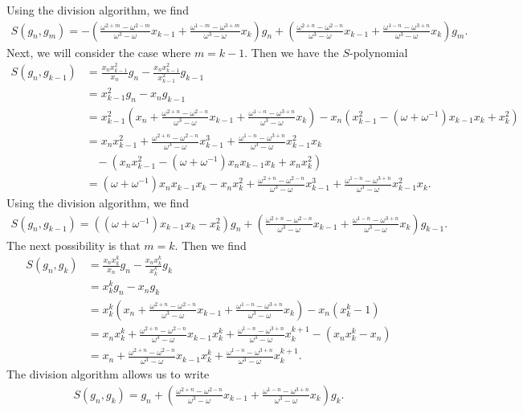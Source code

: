 \documentclass[letterpaper]{article}
\newcommand{\aln}[1]{\begin{align*} #1 \end{align*}} %
\newcommand{\fitp}[1]{\left( #1 \right)} %
\begin{document}
Using the division algorithm, we find
\aln{
  S(g_n, g_m) = -\fitp{\frac{\omega^{2+m} - \omega^{2-m}}{\omega^3-\omega} x_{k-1} + \frac{\omega^{1-m} - \omega^{3+m}}{\omega^3 - \omega} x_k} g_n + \fitp{\frac{\omega^{2+n} - \omega^{2-n}}{\omega^3-\omega} x_{k-1} + \frac{\omega^{1-n} - \omega^{3+n}}{\omega^3 - \omega} x_k} g_m.
}
Next, we will consider the case where $m = k-1$. Then we have the $S$-polynomial
\aln{
  S(g_n, g_{k-1}) &= \frac{x_n x_{k-1}^2}{x_n} g_n - \frac{x_n x_{k-1}^2}{x_{k-1}^2} g_{k-1}\\
  &= x_{k-1}^2 g_n - x_n g_{k-1}\\
  &= x_{k-1}^2 \fitp{x_n + \frac{\omega^{2+n} - \omega^{2-n}}{\omega^3 - \omega} x_{k-1} + \frac{\omega^{1-n} - \omega^{3+n}}{\omega^3 - \omega} x_k} - x_n \fitp{x_{k-1}^2 - (\omega + \omega^{-1}) x_{k-1} x_k + x_k^2}\\
  &= x_n x_{k-1}^2 + \frac{\omega^{2+n} - \omega^{2-n}}{\omega^3 - \omega} x_{k-1}^3 + \frac{\omega^{1-n} - \omega^{3+n}}{\omega^3 - \omega} x_{k-1}^2 x_k\\&~~~~ - \fitp{x_n x_{k-1}^2 - (\omega + \omega^{-1}) x_n x_{k-1} x_k + x_n x_k^2}\\
  &= (\omega + \omega^{-1}) x_n x_{k-1} x_k - x_n x_k^2 + \frac{\omega^{2+n} - \omega^{2-n}}{\omega^3 - \omega} x_{k-1}^3 + \frac{\omega^{1-n} - \omega^{3+n}}{\omega^3 - \omega} x_{k-1}^2 x_k.
}
Using the division algorithm, we find
\aln{
  S(g_n, g_{k-1}) = \fitp{(\omega + \omega^{-1}) x_{k-1} x_k - x_k^2} g_n + \fitp{\frac{\omega^{2+n} - \omega^{2-n}}{\omega^3 - \omega} x_{k-1} + \frac{\omega^{1-n} - \omega^{3+n}}{\omega^3 - \omega} x_k} g_{k-1}.
}
The next possibility is that $m = k$. Then we find
\aln{
  S(g_n, g_k) &= \frac{x_n x_k^k}{x_n} g_n - \frac{x_n x_k^k}{x_k^k} g_k\\
  &= x_k^k g_n - x_n g_k\\
  &= x_k^k \fitp{x_n + \frac{\omega^{2+n} - \omega^{2-n}}{\omega^3 - \omega} x_{k-1} + \frac{\omega^{1-n} - \omega^{3+n}}{\omega^3 - \omega} x_k} - x_n (x_k^k - 1)\\
  &= x_n x_k^k + \frac{\omega^{2+n} - \omega^{2-n}}{\omega^3 - \omega} x_{k-1} x_k^k + \frac{\omega^{1-n} - \omega^{3+n}}{\omega^3 - \omega} x_k^{k+1} - (x_n x_k^k - x_n)\\
  &= x_n + \frac{\omega^{2+n} - \omega^{2-n}}{\omega^3 - \omega} x_{k-1} x_k^k + \frac{\omega^{1-n} - \omega^{3+n}}{\omega^3 - \omega} x_k^{k+1}.
}
The division algorithm allows us to write
\aln{
  S(g_n, g_k) = g_n + \fitp{\frac{\omega^{2+n} - \omega^{2-n}}{\omega^3 - \omega} x_{k-1} + \frac{\omega^{1-n} - \omega^{3+n}}{\omega^3 - \omega} x_k} g_k.
}
\end{document}

